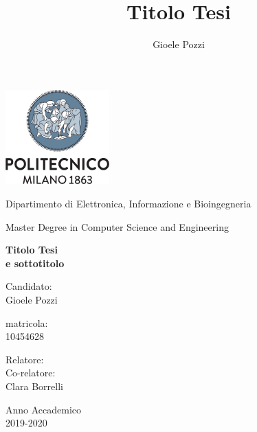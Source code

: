 \documentclass[oneside]{book}
\author{Gioele Pozzi}
\title{Titolo Tesi}
\begin{document}
\centering
\includegraphics[width=4cm]{../pictures/logo_archetype_vertical}

\vspace{1cm}
Dipartimento di Elettronica, Informazione e Bioingegneria

\vspace{0.25cm}
Master Degree in Computer Science and Engineering

\vspace{2cm}
\centering

\color{BrickRed}
\Huge
\textbf{
Titolo Tesi \\%
\Large e sottotitolo}

\normalsize
\vspace{2cm}
\color{black}
\flushright
Candidato:\\Gioele Pozzi

\vspace{0.5cm}
matricola:\\10454628

\vspace{0.5cm}
\flushleft
Relatore:\\

\vspace{0.5cm}
Co-relatore:\\ Clara Borrelli



\vfill
\centering
Anno Accademico \\ 2019-2020

\end{document}
